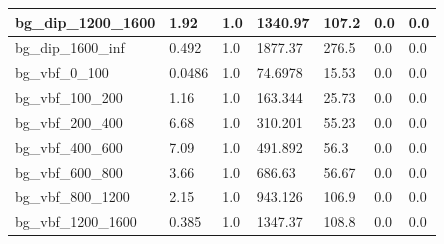 \documentclass[a4paper, 10pt]{article}
\begin{document}
\begin{table}[H]
\begin{center}
\begin{tabular}{|m{23.0mm}|m{23.0mm}|m{18.0mm}|m{19.0mm}|m{19.0mm}|m{19.0mm}|m{19.0mm}|}
      \hline
      {\cellcolor{white}         bg\_dip\_1200\_1600}& {\cellcolor{white}         1.92}& {\cellcolor{white}         1.0}& {\cellcolor{white}         1340.97}& {\cellcolor{white}         107.2}& {\cellcolor{green}         0.0}& {\cellcolor{green}         0.0}\\
      \hline
      {\cellcolor{white}         bg\_dip\_1600\_inf}& {\cellcolor{white}         0.492}& {\cellcolor{white}         1.0}& {\cellcolor{white}         1877.37}& {\cellcolor{white}         276.5}& {\cellcolor{green}         0.0}& {\cellcolor{green}         0.0}\\
      \hline
      {\cellcolor{white}         bg\_vbf\_0\_100}& {\cellcolor{white}         0.0486}& {\cellcolor{white}         1.0}& {\cellcolor{white}         74.6978}& {\cellcolor{white}         15.53}& {\cellcolor{green}         0.0}& {\cellcolor{green}         0.0}\\
      \hline
      {\cellcolor{white}         bg\_vbf\_100\_200}& {\cellcolor{white}         1.16}& {\cellcolor{white}         1.0}& {\cellcolor{white}         163.344}& {\cellcolor{white}         25.73}& {\cellcolor{green}         0.0}& {\cellcolor{green}         0.0}\\
      \hline
      {\cellcolor{white}         bg\_vbf\_200\_400}& {\cellcolor{white}         6.68}& {\cellcolor{white}         1.0}& {\cellcolor{white}         310.201}& {\cellcolor{white}         55.23}& {\cellcolor{green}         0.0}& {\cellcolor{green}         0.0}\\
      \hline
      {\cellcolor{white}         bg\_vbf\_400\_600}& {\cellcolor{white}         7.09}& {\cellcolor{white}         1.0}& {\cellcolor{white}         491.892}& {\cellcolor{white}         56.3}& {\cellcolor{green}         0.0}& {\cellcolor{green}         0.0}\\
      \hline
      {\cellcolor{white}         bg\_vbf\_600\_800}& {\cellcolor{white}         3.66}& {\cellcolor{white}         1.0}& {\cellcolor{white}         686.63}& {\cellcolor{white}         56.67}& {\cellcolor{green}         0.0}& {\cellcolor{green}         0.0}\\
      \hline
      {\cellcolor{white}         bg\_vbf\_800\_1200}& {\cellcolor{white}         2.15}& {\cellcolor{white}         1.0}& {\cellcolor{white}         943.126}& {\cellcolor{white}         106.9}& {\cellcolor{green}         0.0}& {\cellcolor{green}         0.0}\\
      \hline
      {\cellcolor{white}         bg\_vbf\_1200\_1600}& {\cellcolor{white}         0.385}& {\cellcolor{white}         1.0}& {\cellcolor{white}         1347.37}& {\cellcolor{white}         108.8}& {\cellcolor{green}         0.0}& {\cellcolor{green}         0.0}\\

\end{tabular}
\end{center}
\end{table}
\end{document}
